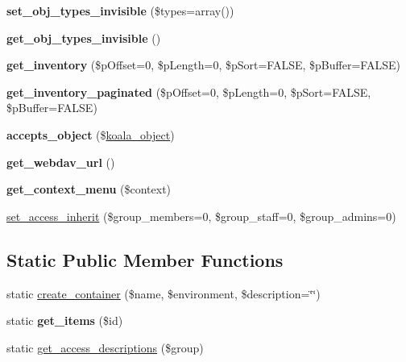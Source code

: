 \begin{DoxyCompactItemize}
\item 
\hypertarget{classkoala__container_ac866e6fc2d0694b4b58ed57ad772b162}{
{\bfseries set\_\-obj\_\-types\_\-invisible} (\$types=array())}
\label{classkoala__container_ac866e6fc2d0694b4b58ed57ad772b162}

\item 
\hypertarget{classkoala__container_adafec7b066d48f29217918d40a9a315b}{
{\bfseries get\_\-obj\_\-types\_\-invisible} ()}
\label{classkoala__container_adafec7b066d48f29217918d40a9a315b}

\item 
\hypertarget{classkoala__container_aa44d74e91d2badc42fa20d7d2b93a586}{
{\bfseries get\_\-inventory} (\$pOffset=0, \$pLength=0, \$pSort=FALSE, \$pBuffer=FALSE)}
\label{classkoala__container_aa44d74e91d2badc42fa20d7d2b93a586}

\item 
\hypertarget{classkoala__container_ae6bdf796a0842781737f5edb50c8cabe}{
{\bfseries get\_\-inventory\_\-paginated} (\$pOffset=0, \$pLength=0, \$pSort=FALSE, \$pBuffer=FALSE)}
\label{classkoala__container_ae6bdf796a0842781737f5edb50c8cabe}

\item 
\hypertarget{classkoala__container_ac22b725e507f76f4bb7ce844276400f9}{
{\bfseries accepts\_\-object} (\$\hyperlink{classkoala__object}{koala\_\-object})}
\label{classkoala__container_ac22b725e507f76f4bb7ce844276400f9}

\item 
\hypertarget{classkoala__container_a8d5be50b704e542ab02e1ab8dfcb2722}{
{\bfseries get\_\-webdav\_\-url} ()}
\label{classkoala__container_a8d5be50b704e542ab02e1ab8dfcb2722}

\item 
\hypertarget{classkoala__container_a33261fb657d054ef0b9bd4a9beed8fb5}{
{\bfseries get\_\-context\_\-menu} (\$context)}
\label{classkoala__container_a33261fb657d054ef0b9bd4a9beed8fb5}

\item 
\hyperlink{classkoala__container_a2f3e677c6ec972b557b04b0b3f9c9a3c}{set\_\-access\_\-inherit} (\$group\_\-members=0, \$group\_\-staff=0, \$group\_\-admins=0)
\end{DoxyCompactItemize}
\subsection*{Static Public Member Functions}
\begin{DoxyCompactItemize}
\item 
static \hyperlink{classkoala__container_abd0b0f506aa6c99cab7f0639e2d4e25d}{create\_\-container} (\$name, \$environment, \$description=\char`\"{}\char`\"{})
\item 
\hypertarget{classkoala__container_a4d36d5f1302d8874e9193777d89cc54c}{
static {\bfseries get\_\-items} (\$id)}
\label{classkoala__container_a4d36d5f1302d8874e9193777d89cc54c}

\item 
static \hyperlink{classkoala__container_a2ebbe0fd7d7ff2a0a11b86f022258e94}{get\_\-access\_\-descriptions} (\$group)
\end{DoxyCompactItemize}
